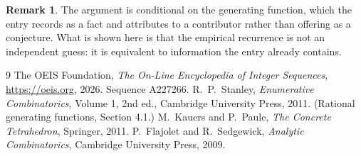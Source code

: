 \documentclass[11pt,a4paper]{article}
\theoremstyle{plain}
\theoremstyle{definition}
\newtheorem{remark}[theorem]{Remark}
\begin{document}
\begin{remark}
The argument is conditional on the generating function, which the entry records as a fact and
attributes to a contributor rather than offering as a conjecture. What is shown here is that
the empirical recurrence is not an independent guess: it is equivalent to information the
entry already contains.
\end{remark}

\begin{thebibliography}{9}
 The OEIS Foundation, \emph{The On-Line Encyclopedia of Integer
Sequences}, \url{https://oeis.org}, 2026. Sequence A227266.
 R.~P.~Stanley, \emph{Enumerative Combinatorics}, Volume 1, 2nd ed.,
Cambridge University Press, 2011. (Rational generating functions, Section 4.1.)
 M.~Kauers and P.~Paule, \emph{The Concrete Tetrahedron}, Springer, 2011.
 P.~Flajolet and R.~Sedgewick, \emph{Analytic Combinatorics}, Cambridge
University Press, 2009.
\end{thebibliography}
\end{document}
